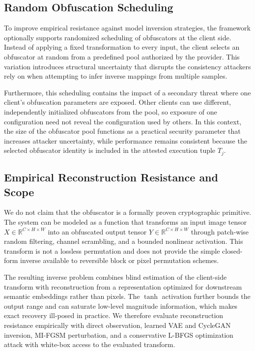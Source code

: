 \documentclass{ieeeaccess}
\newcommand{\rev}[1]{{\color{green}#1}}
\begin{document}
\subsection{\rev{Random Obfuscation Scheduling}}
\rev{To improve empirical resistance against model inversion strategies, the framework optionally supports randomized scheduling of obfuscators at the client side. Instead of applying a fixed transformation to every input, the client selects an obfuscator at random from a predefined pool authorized by the provider. This variation introduces structural uncertainty that disrupts the consistency attackers rely on when attempting to infer inverse mappings from multiple samples.}

\rev{Furthermore, this scheduling contains the impact of a secondary threat where one client's obfuscation parameters are exposed. Other clients can use different, independently initialized obfuscators from the pool, so exposure of one configuration need not reveal the configuration used by others. In this context, the size of the obfuscator pool functions as a practical security parameter that increases attacker uncertainty, while performance remains consistent because the selected obfuscator identity is included in the attested execution tuple $T_j$.}

\subsection{\rev{Empirical Reconstruction Resistance and Scope}}\label{sec:non-inv}

\rev{We do not claim that the obfuscator is a formally proven cryptographic primitive. The system can be modeled as a function that transforms an input image tensor $X \in \mathbb{R}^{C \times H \times W}$ into an obfuscated output tensor $Y \in \mathbb{R}^{C \times H \times W}$ through patch-wise random filtering, channel scrambling, and a bounded nonlinear activation. This transform is not a lossless permutation and does not provide the simple closed-form inverse available to reversible block or pixel permutation schemes.}

\rev{The resulting inverse problem combines blind estimation of the client-side transform with reconstruction from a representation optimized for downstream semantic embeddings rather than pixels. The $\tanh$ activation further bounds the output range and can saturate low-level magnitude information, which makes exact recovery ill-posed in practice. We therefore evaluate reconstruction resistance empirically with direct observation, learned VAE and CycleGAN inversion, MI-FGSM perturbation, and a conservative L-BFGS optimization attack with white-box access to the evaluated transform.}
\end{document}
